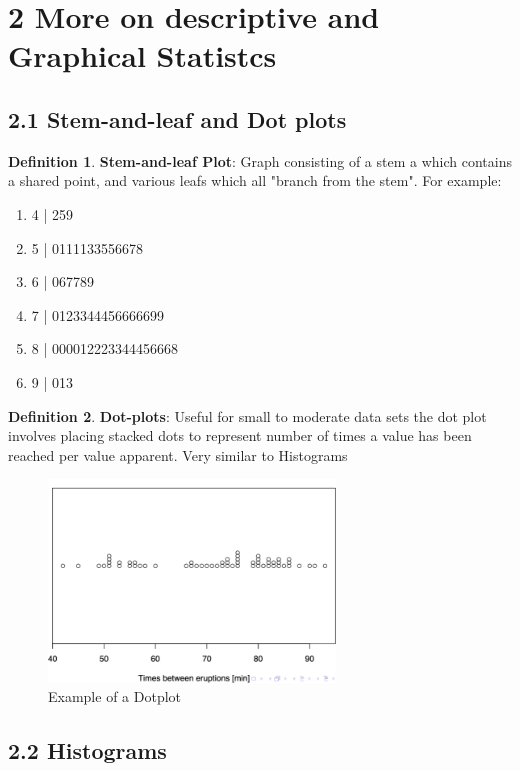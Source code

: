 \documentclass[12pt]{amsart}
\theoremstyle{definition}
\newtheorem{definition}{Definition} %
\numberwithin{equation}{theorem}    %
\begin{document}
\section*{2 More on descriptive and Graphical Statistcs}

\subsection*{2.1 Stem-and-leaf and Dot plots}

\begin{definition}
    
    \textbf{Stem-and-leaf Plot}:
    Graph consisting of a stem a which contains a shared point, and various leafs which all "branch from the stem". For example: 
    \begin{enumerate}
        \item 4 | 259 
        \item 5 | 0111133556678
        \item 6 | 067789
        \item 7 | 0123344456666699
        \item 8 | 000012223344456668
        \item 9 | 013
    \end{enumerate} 
\end{definition}

\begin{definition}
    \textbf{Dot-plots}:
    Useful for small to moderate data sets the dot plot involves placing stacked dots to represent number of times a value has been reached per value apparent. Very similar to Histograms
\end{definition}


\begin{figure}[H]
    \centering
    \includegraphics[width=3in]{Media/dotplot.png}
    \caption{Example of a Dotplot}
    \label{Dotplot}
\end{figure}

\subsection*{2.2 Histograms}
\end{document}
